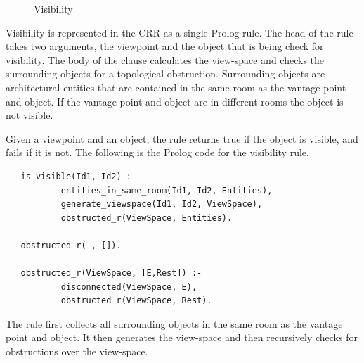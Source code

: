 \documentclass[12pt]{ucthesis}
\begin{document}
\begin{figure}[H]
 \centering
  \hspace{10 mm}
 \caption{Visibility}
\label{Visibility}
\end{figure}

Visibility is represented in the CRR as a single Prolog rule. The head of the rule takes two arguments, the viewpoint and the object that is being check for visibility. The body of the clause calculates the view-space and checks the surrounding objects for a topological obstruction. Surrounding objects are architectural entities that are contained in the same room as the vantage point and object. If the vantage point and object are in different rooms the object is not visible.

Given a viewpoint and an object, the rule returns true if the object is visible, and fails if it is not. The following is the Prolog code for the visibility rule.
\begin{verbatim}
   is_visible(Id1, Id2) :-
           entities_in_same_room(Id1, Id2, Entities), 
           generate_viewspace(Id1, Id2, ViewSpace),
           obstructed_r(ViewSpace, Entities).
           
   obstructed_r(_, []).           
           
   obstructed_r(ViewSpace, [E,Rest]) :-
           disconnected(ViewSpace, E),
           obstructed_r(ViewSpace, Rest).
\end{verbatim} The rule first collects all surrounding objects in the same room as the vantage point and object. It then generates the view-space and then recursively checks for obstructions over the view-space. 
\end{document}
